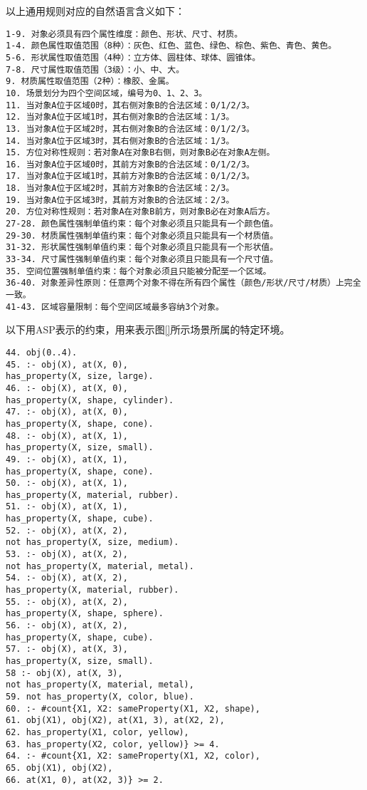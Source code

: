 以上通用规则对应的自然语言含义如下：
\begin{lstlisting}
1-9. 对象必须具有四个属性维度：颜色、形状、尺寸、材质。
1-4. 颜色属性取值范围（8种）：灰色、红色、蓝色、绿色、棕色、紫色、青色、黄色。
5-6. 形状属性取值范围（4种）：立方体、圆柱体、球体、圆锥体。
7-8. 尺寸属性取值范围（3级）：小、中、大。
9. 材质属性取值范围（2种）：橡胶、金属。
10. 场景划分为四个空间区域，编号为0、1、2、3。
11. 当对象A位于区域0时，其右侧对象B的合法区域：0/1/2/3。
12. 当对象A位于区域1时，其右侧对象B的合法区域：1/3。
13. 当对象A位于区域2时，其右侧对象B的合法区域：0/1/2/3。
14. 当对象A位于区域3时，其右侧对象B的合法区域：1/3。
15. 方位对称性规则：若对象A在对象B右侧，则对象B必在对象A左侧。
16. 当对象A位于区域0时，其前方对象B的合法区域：0/1/2/3。
17. 当对象A位于区域1时，其前方对象B的合法区域：0/1/2/3。
18. 当对象A位于区域2时，其前方对象B的合法区域：2/3。
19. 当对象A位于区域3时，其前方对象B的合法区域：2/3。
20. 方位对称性规则：若对象A在对象B前方，则对象B必在对象A后方。
27-28. 颜色属性强制单值约束：每个对象必须且只能具有一个颜色值。
29-30. 材质属性强制单值约束：每个对象必须且只能具有一个材质值。
31-32. 形状属性强制单值约束：每个对象必须且只能具有一个形状值。
33-34. 尺寸属性强制单值约束：每个对象必须且只能具有一个尺寸值。
35. 空间位置强制单值约束：每个对象必须且只能被分配至一个区域。
36-40. 对象差异性原则：任意两个对象不得在所有四个属性（颜色/形状/尺寸/材质）上完全一致。
41-43. 区域容量限制：每个空间区域最多容纳3个对象。
\end{lstlisting}
以下用ASP表示的约束，用来表示图\ref{}所示场景所属的特定环境。
\begin{lstlisting}
44. obj(0..4).
45. :- obj(X), at(X, 0),
has_property(X, size, large).
46. :- obj(X), at(X, 0),
has_property(X, shape, cylinder).
47. :- obj(X), at(X, 0),
has_property(X, shape, cone).
48. :- obj(X), at(X, 1),
has_property(X, size, small).
49. :- obj(X), at(X, 1),
has_property(X, shape, cone).
50. :- obj(X), at(X, 1),
has_property(X, material, rubber).
51. :- obj(X), at(X, 1),
has_property(X, shape, cube).
52. :- obj(X), at(X, 2),
not has_property(X, size, medium).
53. :- obj(X), at(X, 2),
not has_property(X, material, metal).
54. :- obj(X), at(X, 2),
has_property(X, material, rubber).
55. :- obj(X), at(X, 2),
has_property(X, shape, sphere).
56. :- obj(X), at(X, 2),
has_property(X, shape, cube).
57. :- obj(X), at(X, 3),
has_property(X, size, small).
58 :- obj(X), at(X, 3),
not has_property(X, material, metal),
59. not has_property(X, color, blue).
60. :- #count{X1, X2: sameProperty(X1, X2, shape),
61. obj(X1), obj(X2), at(X1, 3), at(X2, 2),
62. has_property(X1, color, yellow),
63. has_property(X2, color, yellow)} >= 4.
64. :- #count{X1, X2: sameProperty(X1, X2, color),
65. obj(X1), obj(X2),
66. at(X1, 0), at(X2, 3)} >= 2.
\end{lstlisting}
